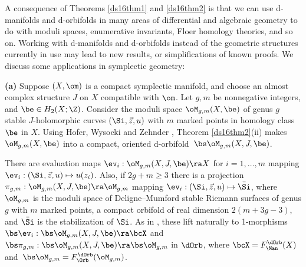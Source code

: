 \documentclass{article}
\begin{document}
A consequence of Theorems \ref{ds16thm1} and \ref{ds16thm2} is that
we can use d-manifolds and d-orbifolds in many areas of differential
and algebraic geometry to do with moduli spaces, enumerative
invariants, Floer homology theories, and so on. Working with
d-manifolds and d-orbifolds instead of the geometric structures
currently in use may lead to new results, or simplifications of
known proofs. We discuss some applications in symplectic geometry:

\begin{rem}{\bf(a)} Suppose $(X,\om)$ is a
compact symplectic manifold, and choose an almost complex structure
$J$ on $X$ compatible with $\om$. Let $g,m$ be nonnegative integers,
and $\be\in H_2(X;\Z)$. Consider the moduli space $\oM_{g,m}(X,\be)$
of genus $g$ stable $J$-holomorphic curves $(\Si,\vec z,u)$ with $m$
marked points in homology class $\be$ in $X$. Using Hofer, Wysocki
and Zehnder \cite{HWZ6}, Theorem \ref{ds16thm2}(ii) makes
$\oM_{g,m}(X,\be)$ into a compact, oriented
d-orbifold~$\bs\oM_{g,m}(X,J,\be)$.

There are evaluation maps $\ev_i:\oM_{g,m}(X,J,\be)\ra X$ for
$i=1,\ldots,m$ mapping $\ev_i:(\Si,\vec z,u)\mapsto u(z_i)$. Also,
if $2g+m\ge 3$ there is a projection
$\pi_{g,m}:\oM_{g,m}(X,J,\be)\ra\oM_{g,m}$ mapping $\ev_i:(\Si,\vec
z,u)\mapsto\bar\Si$, where $\oM_{g,m}$ is the moduli space of
Deligne--Mumford stable Riemann surfaces of genus $g$ with $m$
marked points, a compact orbifold of real dimension $2(m+3g-3)$, and
$\bar\Si$ is the stabilization of $\Si$. As in \cite[\S
14.2]{Joyc6}, these lift naturally to 1-morphisms
$\bs\ev_i:\bs\oM_{g,m}(X,J,\be)\ra \bcX$ and $\bs\pi_{g,m}:
\bs\oM_{g,m}(X,J,\be)\ra\bs\oM_{g,m}$ in $\dOrb$, where
$\bcX=F_\Man^\dOrb(X)$ and~$\bs\oM_{g,m}=F_\Orb^\dOrb(\oM_{g,m})$.


\end{rem}
\end{document}
